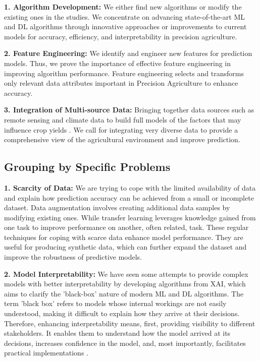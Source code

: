 \documentclass[conference]{IEEEtran}
\begin{document}
\textbf{1. Algorithm Development:}
We either find new algorithms or modify the existing ones in the studies. We concentrate on advancing state-of-the-art ML and DL algorithms through innovative approaches or improvements to current models for accuracy, efficiency, and interpretability in precision agriculture.

\textbf{2. Feature Engineering:}
We identify and engineer new features for prediction models. Thus, we prove the importance of effective feature engineering in improving algorithm performance. Feature engineering selects and transforms only relevant data attributes important in Precision Agriculture to enhance accuracy.

\textbf{3. Integration of Multi-source Data:}
Bringing together data sources such as remote sensing and climate data to build full models of the factors that may influence crop yields \cite{b74}. We call for integrating very diverse data to provide a comprehensive view of the agricultural environment and improve prediction.

\subsection{Grouping by Specific Problems}

\textbf{1. Scarcity of Data:} 
We are trying to cope with the limited availability of data and explain how prediction accuracy can be achieved from a small or incomplete dataset. Data augmentation involves creating additional data samples by modifying existing ones. While transfer learning leverages knowledge gained from one task to improve performance on another, often related, task. These regular techniques for coping with scarce data enhance model performance. They are useful for producing synthetic data, which can further expand the dataset and improve the robustness of predictive models.

\textbf{2. Model Interpretability:}
We have seen some attempts to provide complex models with better interpretability by developing algorithms from XAI, which aims to clarify the 'black-box' nature of modern ML and DL algorithms. The term 'black box' refers to models whose internal workings are not easily understood, making it difficult to explain how they arrive at their decisions. Therefore, enhancing interpretability means, first, providing visibility to different stakeholders. It enables them to understand how the model arrived at its decisions, increases confidence in the model, and, most importantly, facilitates practical implementations \cite{b75}.
\end{document}
